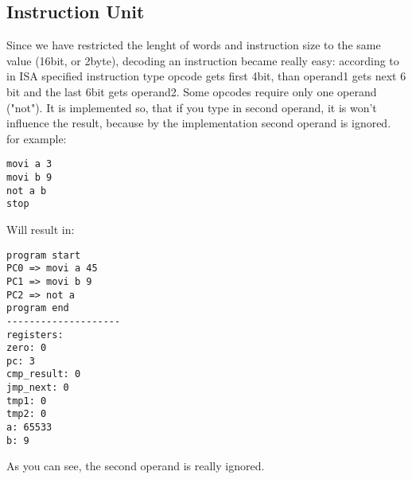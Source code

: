 \documentclass[11pt,a4paper]{article}
\begin{document}
\subsection{Instruction Unit}
Since we have restricted the lenght of words and instruction size to the same value (16bit, or 2byte), decoding an instruction became really easy:
according to in ISA specified instruction type opcode gets first 4bit, than operand1 gets next 6 bit and the last 6bit gets operand2. Some opcodes require only one operand ("not"). It is implemented so, that if you type in second operand, it is won't influence the result, because by the implementation second operand is ignored.
for example:
\begin{verbatim}
movi a 3
movi b 9
not a b
stop
\end{verbatim}
Will result in:
\begin{verbatim}
program start
PC0 => movi a 45
PC1 => movi b 9
PC2 => not a
program end
--------------------
registers:
zero: 0
pc: 3
cmp_result: 0
jmp_next: 0
tmp1: 0
tmp2: 0
a: 65533
b: 9
\end{verbatim}
As you can see, the second operand is really ignored.\\

\newpage
\end{document}
